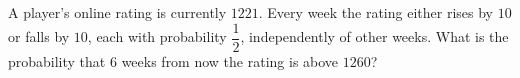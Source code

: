 A player's online rating is currently $1221$. Every week the rating either rises by $10$ or falls by $10$, each with probability $\dfrac12$, independently of other weeks. What is the probability that $6$ weeks from now the rating is above $1260$?
